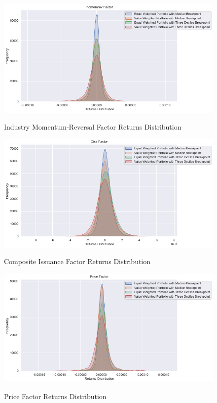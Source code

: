 \begin{figure}[H]
	\caption{Industry Momentum-Reversal Factor Returns Distribution}
	\centering
	\includegraphics[scale=.63]{../../output/figures/indmomrev.png}
	\label{fig:indmomrev}
\end{figure}

\begin{figure}[H]
	\caption{Composite Issuance Factor Returns Distribution}
	\centering
	\includegraphics[scale=.63]{../../output/figures/ciss.png}
	\label{fig:ciss}
\end{figure}

\begin{figure}[H]
	\caption{Price Factor Returns Distribution}
	\centering
	\includegraphics[scale=.63]{../../output/figures/price.png}
	\label{fig:price}
\end{figure}

